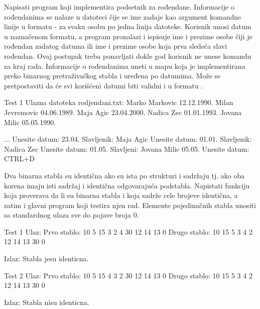 \begin{Exercise}[label=706]
Napisati program koji implementira podsetnik za rođendane. Informacije o rođendanima se nalaze u datoteci čije se ime zadaje kao argument komandne linije u formatu  - za svaku osobu po jedna linija datoteke. Korisnik unosi datum u naznačenom formatu, a program pronalazi i ispisuje ime i prezime osobe čiji je rođendan zadatog datuma ili ime i prezime osobe koja prva sledeća slavi rođendan. Ovaj postupak treba ponavljati dokle god korisnik ne unese komandu za kraj rada. Informacije o rođendanima uneti u mapu koja je implementirana preko binarnog pretraživačkog stabla i uređena po datumima. Može se pretpostaviti da će svi korišćeni datumi biti validni i u formatu .
\begin{maxitest}
\begin{test}{Test 1}
Ulazna datoteka rodjendani.txt:
Marko Markovic 12.12.1990.
Milan Jevremovic 04.06.1989.
Maja Agic 23.04.2000.
Nadica Zec 01.01.1993.
Jovana Milic 05.05.1990.

...
Unesite datum: 23.04.
Slavljenik: Maja Agic 
Unesite datum: 01.01.
Slavljenik: Nadica Zec
Unesite datum: 01.05.
Slavljeni: Jovana Milic 05.05.
Unesite datum: CTRL+D
\end{test}
\end{maxitest}
\end{Exercise}

\begin{Answer}[ref=706]
\end{Answer}



\begin{Exercise}[label=707]
Dva binarna stabla su identična ako su ista po strukturi i sadržaju tj. ako oba korena imaju isti sadržaj i identična odgovarajuća podstabla. Napistati funkciju  koja proverava da li su binarna stabla  i  koja sadrže cele brojeve identična, a zatim i glavni program koji testira njen rad. Elemente pojedinačnih stabla unositi sa standardnog ulaza sve do pojave broja $0$.

\begin{maxitest}
\begin{test}{Test 1}
Ulaz:
Prvo stablo: 10 5 15 3 2 4 30 12 14 13 0
Drugo stablo: 10 15 5 3 4 2 12 14 13 30 0

Izlaz:
Stabla jesu identicna.
\end{test}
\end{maxitest}

\begin{maxitest}
\begin{test}{Test 2}
Ulaz:
Prvo stablo: 10 5 15 4 3 2 30 12 14 13 0
Drugo stablo: 10 15 5 3 4 2 12 14 13 30 0

Izlaz:
Stabla nisu identicna.
\end{test}
\end{maxitest}

\end{Exercise}

